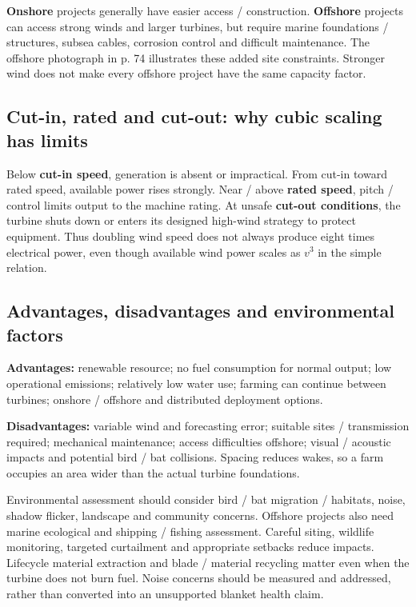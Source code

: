 \documentclass[11pt,a4paper]{article}
\begin{document}
\textbf{Onshore} projects generally have easier access / construction. \textbf{Offshore} projects can access strong winds and larger turbines, but require marine foundations / structures, subsea cables, corrosion control and difficult maintenance. The offshore photograph in p. 74 illustrates these added site constraints. Stronger wind does not make every offshore project have the same capacity factor.

\subsection{Cut-in, rated and cut-out: why cubic scaling has limits}
Below \textbf{cut-in speed}, generation is absent or impractical. From cut-in toward rated speed, available power rises strongly. Near / above \textbf{rated speed}, pitch / control limits output to the machine rating. At unsafe \textbf{cut-out conditions}, the turbine shuts down or enters its designed high-wind strategy to protect equipment. Thus doubling wind speed does not always produce eight times electrical power, even though available wind power scales as $v^3$ in the simple relation.

\subsection{Advantages, disadvantages and environmental factors}
\textbf{Advantages:} renewable resource; no fuel consumption for normal output; low operational emissions; relatively low water use; farming can continue between turbines; onshore / offshore and distributed deployment options.

\textbf{Disadvantages:} variable wind and forecasting error; suitable sites / transmission required; mechanical maintenance; access difficulties offshore; visual / acoustic impacts and potential bird / bat collisions. Spacing reduces wakes, so a farm occupies an area wider than the actual turbine foundations.

Environmental assessment should consider bird / bat migration / habitats, noise, shadow flicker, landscape and community concerns. Offshore projects also need marine ecological and shipping / fishing assessment. Careful siting, wildlife monitoring, targeted curtailment and appropriate setbacks reduce impacts. Lifecycle material extraction and blade / material recycling matter even when the turbine does not burn fuel. Noise concerns should be measured and addressed, rather than converted into an unsupported blanket health claim.
\end{document}
